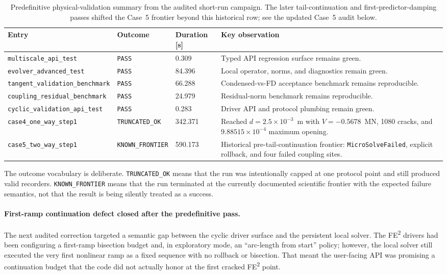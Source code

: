 \begin{table}[htb]
\centering
\small
\begin{tabular}{p{}p{}p{}p{}}
\toprule
Entry & Outcome & Duration [s] & Key observation \\
\midrule
\texttt{multiscale\_api\_test} &
\texttt{PASS} &
0.309 &
Typed API regression surface remains green. \\
\texttt{evolver\_advanced\_test} &
\texttt{PASS} &
84.396 &
Local operator, norms, and diagnostics remain green. \\
\texttt{tangent\_validation\_benchmark} &
\texttt{PASS} &
66.288 &
Condensed-vs-FD acceptance benchmark remains reproducible. \\
\texttt{coupling\_residual\_benchmark} &
\texttt{PASS} &
24.979 &
Residual-norm benchmark remains reproducible. \\
\texttt{cyclic\_validation\_api\_test} &
\texttt{PASS} &
0.283 &
Driver API and protocol plumbing remain green. \\
\texttt{case4\_one\_way\_step1} &
\texttt{TRUNCATED\_OK} &
342.371 &
Reached \(d=2.5\times 10^{-3}\)~m with
\(V=-0.5678\)~MN, 1080 cracks, and
\(9.88515\times 10^{-4}\) maximum opening. \\
\texttt{case5\_two\_way\_step1} &
\texttt{KNOWN\_FRONTIER} &
590.173 &
Historical pre-tail-continuation frontier:
\texttt{MicroSolveFailed}, explicit rollback, and four failed coupling sites. \\
\bottomrule
\end{tabular}
\caption{Predefinitive physical-validation summary from the audited short-run
campaign.  The later tail-continuation and first-predictor-damping passes
shifted the Case~5 frontier beyond this historical row; see the updated
Case~5 audit below.}
\label{tab:ms-stab-predefinitive-summary}
\end{table}

The outcome vocabulary is deliberate.  \texttt{TRUNCATED\_OK} means that the
run was intentionally capped at one protocol point and still produced valid
recorders.  \texttt{KNOWN\_FRONTIER} means that the run terminated at the
currently documented scientific frontier with the expected failure semantics,
not that the result is being silently treated as a success.

\paragraph{First-ramp continuation defect closed after the predefinitive pass.}
The next audited correction targeted a semantic gap between the cyclic driver
surface and the persistent local solver.  The FE\textsuperscript{2} drivers had
been configuring a first-ramp bisection budget and, in exploratory mode, an
``arc-length from start'' policy; however, the local solver still executed the
very first nonlinear ramp as a fixed sequence with no rollback or bisection.
That meant the user-facing API was promising a continuation budget that the
code did not actually honor at the first cracked FE\textsuperscript{2} point.

